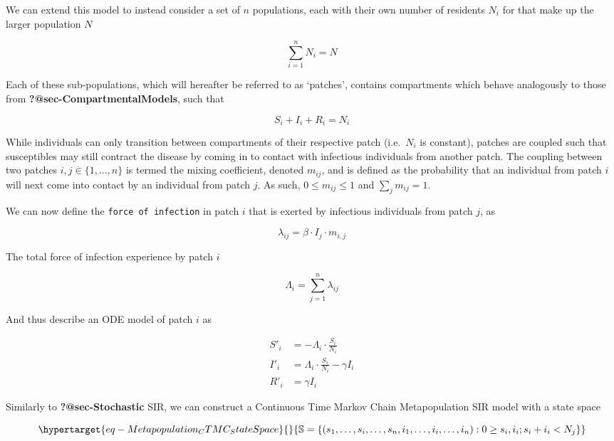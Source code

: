 \documentclass[
  letterpaper,
  DIV=11,
  numbers=noendperiod]{scrartcl}
\begin{document}
We can extend this model to instead consider a set of \(n\) populations,
each with their own number of residents \(N_i\) for that make up the
larger population \(N\)

\[
\sum\limits_{i=1}^{n}N_i = N
\]

Each of these sub-populations, which will hereafter be referred to as
`patches', contains compartments which behave analogously to those from
\textbf{?@sec-CompartmentalModels}, such that

\[ S_{i} + I_i + R_i = N_i \]

While individuals can only transition between compartments of their
respective patch (i.e.~\(N_i\) is constant), patches are coupled such
that susceptibles may still contract the disease by coming in to contact
with infectious individuals from another patch. The coupling between two
patches \(i,j \in \{1,\ldots, n\}\) is termed the mixing coefficient,
denoted \(m_{ij}\), and is defined as the probability that an individual
from patch \(i\) will next come into contact by an individual from patch
\(j\). As such, \(0 \leq m_{ij} \leq 1\) and \(\sum_j m_{ij} =1\).

We can now define the \texttt{force\ of\ infection} in patch \(i\) that
is exerted by infectious individuals from patch \(j\), as

\[
\lambda_{ij} = \beta \cdot I_j \cdot m_{i,j}
\]

The total force of infection experience by patch \(i\)

\[
\Lambda_i = \sum\limits_{j =1}^{n}\lambda_{ij}
\]

And thus describe an ODE model of patch \(i\) as

\[
\begin{aligned}
S'_{i} & =-\Lambda_i \cdot \frac{S_i}{N_i} \\
I'_{i} & =\Lambda_i \cdot \frac{S_i}{N_{i}}-\gamma I_i \\
R'_{i} & = \gamma I_i
\end{aligned}
\]

Similarly to \textbf{?@sec-Stochastic} SIR, we can construct a
Continuous Time Markov Chain Metapopulation SIR model with a state space

\begin{equation}\protect\hypertarget{eq-Metapopulation_CTMC_StateSpace}{}{\mathbb{S}=\left\{\left(s_1,  \ldots, s_i, \ldots, s_n, i_1,\ldots, i_i, \ldots , i_n\right): 0\geq s_i, i_i; s_i+i_i<N_j\right\}}\label{eq-Metapopulation_CTMC_StateSpace}\end{equation}
\end{document}
